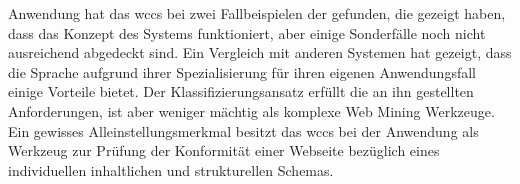     Anwendung hat das \gls{wccs} bei zwei Fallbeispielen der {\fernUni} gefunden,
    die gezeigt haben, dass das Konzept des Systems funktioniert,
    aber einige Sonderfälle noch nicht ausreichend abgedeckt sind.
    Ein Vergleich mit anderen Systemen hat gezeigt,
    dass die Sprache aufgrund ihrer Spezialisierung für ihren eigenen
    Anwendungsfall einige Vorteile bietet.
    Der Klassifizierungsansatz erfüllt die an ihn gestellten Anforderungen,
    ist aber weniger mächtig als komplexe Web Mining Werkzeuge.
    Ein gewisses Alleinstellungsmerkmal besitzt das \gls{wccs}
    bei der Anwendung als Werkzeug zur Prüfung der Konformität
    einer Webseite bezüglich eines individuellen inhaltlichen und strukturellen Schemas.